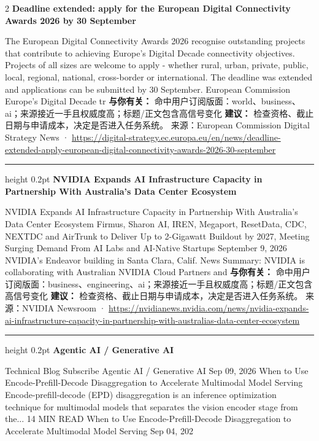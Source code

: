 \documentclass[10.5pt]{ctexart}
\begin{document}
\begin{multicols}{2}
{\large\bfseries Deadline extended: apply for the European Digital Connectivity Awards 2026 by 30 September}\par
The European Digital Connectivity Awards 2026 recognise outstanding projects that contribute to achieving Europe’s Digital Decade connectivity objectives. Projects of all sizes are welcome to apply - whether rural, urban, private, public, local, regional, national, cross-border or international. The deadline was extended and applications can be submitted by 30 September. European Commission Europe’s Digital Decade tr
\textbf{与你有关：} 命中用户订阅版面：world、business、ai；来源接近一手且权威度高；标题/正文包含高信号变化
\textbf{建议：} 检查资格、截止日期与申请成本，决定是否进入任务系统。
{\footnotesize\color{ormuted} 来源：European Commission Digital Strategy News · \url{https://digital-strategy.ec.europa.eu/en/news/deadline-extended-apply-european-digital-connectivity-awards-2026-30-september}}
\vspace{2mm}
\hrule height 0.2pt
\vspace{2mm}
{\large\bfseries NVIDIA Expands AI Infrastructure Capacity in Partnership With Australia’s Data Center Ecosystem}\par
NVIDIA Expands AI Infrastructure Capacity in Partnership With Australia’s Data Center Ecosystem Firmus, Sharon AI, IREN, Megaport, ResetData, CDC, NEXTDC and AirTrunk to Deliver Up to 2-Gigawatt Buildout by 2027, Meeting Surging Demand From AI Labs and AI-Native Startups September 9, 2026 NVIDIA's Endeavor building in Santa Clara, Calif. News Summary: NVIDIA is collaborating with Australian NVIDIA Cloud Partners and 
\textbf{与你有关：} 命中用户订阅版面：business、engineering、ai；来源接近一手且权威度高；标题/正文包含高信号变化
\textbf{建议：} 检查资格、截止日期与申请成本，决定是否进入任务系统。
{\footnotesize\color{ormuted} 来源：NVIDIA Newsroom · \url{https://nvidianews.nvidia.com/news/nvidia-expands-ai-infrastructure-capacity-in-partnership-with-australias-data-center-ecosystem}}
\vspace{2mm}
\hrule height 0.2pt
\vspace{2mm}
{\large\bfseries Agentic AI / Generative AI}\par
Technical Blog Subscribe Agentic AI / Generative AI Sep 09, 2026 When to Use Encode-Prefill-Decode Disaggregation to Accelerate Multimodal Model Serving Encode-prefill-decode (EPD) disaggregation is an inference optimization technique for multimodal models that separates the vision encoder stage from the... 14 MIN READ When to Use Encode-Prefill-Decode Disaggregation to Accelerate Multimodal Model Serving Sep 04, 202

\end{multicols}
\end{document}
